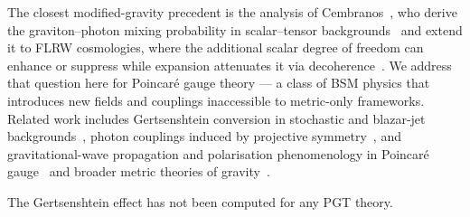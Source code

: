 The closest modified-gravity precedent is the analysis of
Cembranos~\etal, who derive the graviton--photon
mixing probability in scalar--tensor
backgrounds~\cite{Cembranos:2018jxo} and extend it to
FLRW cosmologies, where the
additional scalar degree of freedom can enhance or suppress
while expansion attenuates it via
decoherence~\cite{Cembranos:2023ere}. We address that question
here for Poincar\'e gauge theory ---
a class of BSM physics that
introduces new fields and couplings inaccessible to metric-only
frameworks.
Related work includes Gertsenshtein conversion in stochastic and
blazar-jet
backgrounds~\cite{Addazi:2024kbq, Matsuo:2025blj}, photon
couplings induced by projective symmetry~\cite{Janssen:2018exh},
and gravitational-wave propagation and polarisation
phenomenology in Poincar\'e gauge~\cite{Obukhov:2017pxa, Katanaev:2020xdv}
and broader metric theories of gravity~\cite{Alves:2023rxs}.

The Gertsenshtein effect has not been computed for any PGT
theory.

